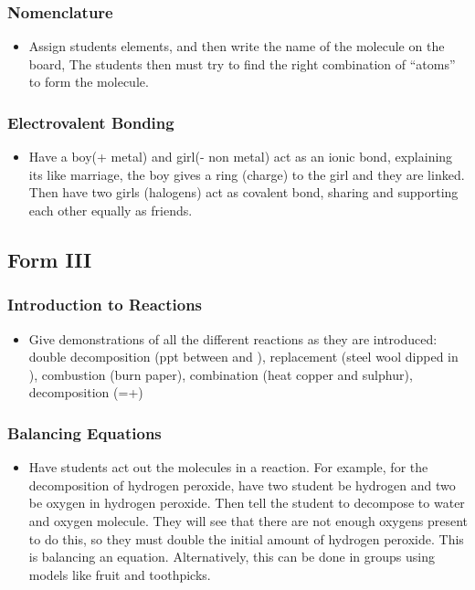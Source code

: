 \subsubsection{Nomenclature}
\begin{itemize}
\item	Assign students elements, and then write the name of the molecule on the board, The students then must try to find the right combination of ``atoms'' to form the molecule. 
\end{itemize}

\subsubsection{Electrovalent Bonding}
\begin{itemize}
\item	Have a boy(+ metal) and girl(- non metal) act as an ionic bond, explaining its like marriage, the boy gives a ring (charge) to the girl and they are linked.  Then have two girls (halogens) act as covalent bond, sharing and supporting each other equally as friends.
\end{itemize}

\subsection{Form III}
\subsubsection{Introduction to Reactions}
\begin{itemize}
\item	Give demonstrations of all the different reactions as they are introduced: double decomposition (ppt between   and ), replacement (steel wool dipped in ), combustion (burn paper), combination (heat copper and sulphur), decomposition (=+) 
\end{itemize}

\subsubsection{Balancing Equations}
\begin{itemize}
\item Have students act out the molecules in a reaction. For example, for the decomposition of hydrogen peroxide, have two student be hydrogen and two be oxygen in hydrogen peroxide. Then tell the student to decompose to water and oxygen molecule. They will see that there are not enough oxygens present to do this, so they must double the initial amount of hydrogen peroxide. This is balancing an equation. Alternatively, this can be done in groups using models like fruit and toothpicks.
\end{itemize}

